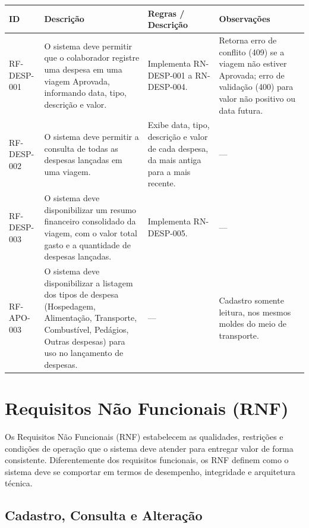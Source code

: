 \documentclass[12pt,article,oneside,a4paper]{abntex2}
\begin{document}
\begin{xltabular}{\textwidth}{|l|Y|Y|Y|}
\hline
{}
\textbf{ID} & \textbf{Descrição} & \textbf{Regras / Descrição} & \textbf{Observações} \\
\hline
\endhead
RF-DESP-001 & O sistema deve permitir que o colaborador registre uma despesa em uma viagem Aprovada, informando data, tipo, descrição e valor. & Implementa RN-DESP-001 a RN-DESP-004. & Retorna erro de conflito (409) se a viagem não estiver Aprovada; erro de validação (400) para valor não positivo ou data futura. \\
\hline
RF-DESP-002 & O sistema deve permitir a consulta de todas as despesas lançadas em uma viagem. & Exibe data, tipo, descrição e valor de cada despesa, da mais antiga para a mais recente. & --- \\
\hline
RF-DESP-003 & O sistema deve disponibilizar um resumo financeiro consolidado da viagem, com o valor total gasto e a quantidade de despesas lançadas. & Implementa RN-DESP-005. & --- \\
\hline
RF-APO-003 & O sistema deve disponibilizar a listagem dos tipos de despesa (Hospedagem, Alimentação, Transporte, Combustível, Pedágios, Outras despesas) para uso no lançamento de despesas. & --- & Cadastro somente leitura, nos mesmos moldes do meio de transporte. \\
\hline
\end{xltabular}

\bigskip

\section{Requisitos Não Funcionais (RNF)}

Os Requisitos Não Funcionais (RNF) estabelecem as qualidades, restrições e
condições de operação que o sistema deve atender para entregar valor de forma
consistente. Diferentemente dos requisitos funcionais, os RNF definem como o
sistema deve se comportar em termos de desempenho, integridade e arquitetura
técnica.

\subsection{Cadastro, Consulta e Alteração}
\end{document}
